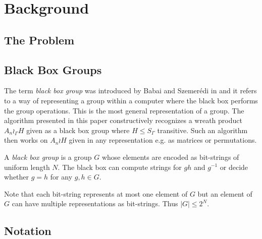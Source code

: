 \section{Background}


\subsection{The Problem}


\subsection{Black Box Groups}

The term \emph{black box group} was introduced by Babai and Szemerédi in \cite{babai1984complexity} and it refers to a way of representing a group within a computer where the black box performs the group operations. 
This is the most general representation of a group.
The algorithm presented in this paper constructively recognizes a wreath product $A_n\wr_\Gamma H$ given as a black box group where $H \leq S_\Gamma$ transitive.
Such an algorithm then works on $A_n\wr H$ given in any representation e.g. as matrices or permutations.
\begin{defn}
A \emph{black box group} is a group $G$ whose elements are encoded as bit-strings of uniform length $N$.
The black box can compute strings for $gh$ and $g^{-1}$ or decide whether $g=h$ for any $g,h \in G$.
\end{defn}
Note that each bit-string represents at most one element of $G$ but an element of $G$ can have multiple representations as bit-strings.
Thus $|G| \leq 2^N$. 

\subsection{Notation}
